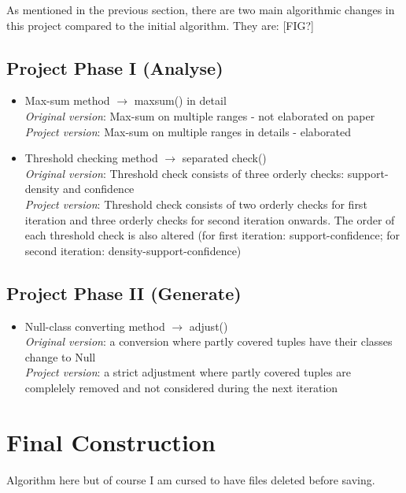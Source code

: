As mentioned in the previous section, there are two main algorithmic changes in this project compared to the initial algorithm. They are:
[FIG?]

\subsection{Project Phase I (Analyse)} 

\begin{itemize}
	\item Max-sum method $\rightarrow$ maxsum() in detail \\
	\textit{Original version}: Max-sum on multiple ranges - not elaborated on paper \\
	\textit{Project version}: Max-sum on multiple ranges in details - elaborated \\

	\item Threshold checking method $\rightarrow$ separated check() \\
	\textit{Original version}: Threshold check consists of three orderly checks: support-density and confidence \\
	\textit{Project version}: Threshold check consists of two orderly checks for first iteration and three orderly checks for second iteration onwards. The order of each threshold check is also altered (for first iteration: support-confidence; for second iteration: density-support-confidence) \\
\end{itemize}

\subsection{Project Phase II (Generate)} 

\begin{itemize}
	\item Null-class converting method $\rightarrow$ adjust() \\
	\textit{Original version}: a conversion where partly covered tuples have their classes change to Null \\
	\textit{Project version}: a strict adjustment where partly covered tuples are complelely removed and not considered during the next iteration \\
\end{itemize}


\section{Final Construction}

Algorithm here but of course I am cursed to have files deleted before saving.



